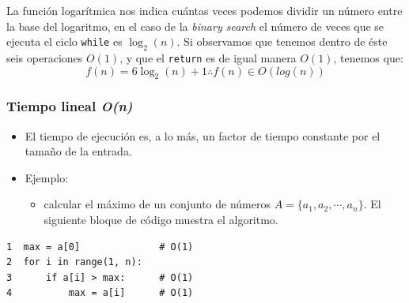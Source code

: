 \documentclass[letterpaper, 12pt]{article}
\begin{document}
La función logarítmica nos indica cuántas veces podemos dividir un número entre
la base del logaritmo, en el caso de la \emph{binary search} el número de veces que
se ejecuta el ciclo \texttt{while} es \(\log_2(n)\). Si observamos que tenemos dentro de
éste seis operaciones \(O(1)\), y que el \texttt{return} es de igual manera \(O(1)\),
tenemos que:
$$
f(n) = 6 \log_2(n) + 1 \therefore f(n) \in O(log(n))
$$
\subsubsection{Tiempo lineal \emph{O(n)}}
\label{sec:orgd0d4b45}
\begin{itemize}
\item El tiempo de ejecución es, a lo más, un factor de tiempo constante por el
tamaño de la entrada.
\item Ejemplo:
\begin{itemize}
\item calcular el máximo de un conjunto de números
\(A = \{a_1, a_2, \cdots, a_n\}\). El siguiente bloque de código muestra el
algoritmo.
\end{itemize}
\end{itemize}
\begin{verbatim}
1  max = a[0]              # O(1)
2  for i in range(1, n):
3      if a[i] > max:      # O(1)
4          max = a[i]      # O(1)
\end{verbatim}
\end{document}
